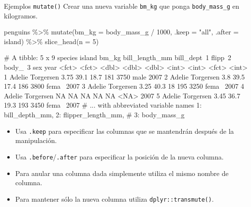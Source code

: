 \documentclass[
  ignorenonframetext,
  aspectratio=169]{beamer}
\newenvironment{Shaded}{\begin{snugshade}}{\end{snugshade}}
\newcommand{\AttributeTok}[1]{\textcolor[rgb]{0.77,0.63,0.00}{#1}}
\newcommand{\DecValTok}[1]{\textcolor[rgb]{0.00,0.00,0.81}{#1}}
\newcommand{\FunctionTok}[1]{\textcolor[rgb]{0.00,0.00,0.00}{#1}}
\newcommand{\NormalTok}[1]{#1}
\newcommand{\SpecialCharTok}[1]{\textcolor[rgb]{0.00,0.00,0.00}{#1}}
\newcommand{\StringTok}[1]{\textcolor[rgb]{0.31,0.60,0.02}{#1}}
\providecommand{\tightlist}{%
  \setlength{\itemsep}{0pt}\setlength{\parskip}{0pt}}
\let\oldverbatim\verbatim
\let\endoldverbatim\endverbatim
\renewenvironment{verbatim}{\tiny\oldverbatim}{\endoldverbatim}
\begin{document}
\begin{frame}[fragile]{Ejemplos \texttt{mutate()}}
\protect\hypertarget{ejemplos-mutate}{}
Crear una nueva variable \texttt{bm\_kg} que ponga
\texttt{body\_mass\_g} en kilogramos.

\begin{Shaded}
\begin{Highlighting}[]
\NormalTok{penguins }\SpecialCharTok{\%\textgreater{}\%} 
  \FunctionTok{mutate}\NormalTok{(}\AttributeTok{bm\_kg =}\NormalTok{ body\_mass\_g }\SpecialCharTok{/} \DecValTok{1000}\NormalTok{, }\AttributeTok{.keep =} \StringTok{"all"}\NormalTok{, }\AttributeTok{.after =}\NormalTok{ island) }\SpecialCharTok{\%\textgreater{}\%} 
  \FunctionTok{slice\_head}\NormalTok{(}\AttributeTok{n =} \DecValTok{5}\NormalTok{)}
\end{Highlighting}
\end{Shaded}

\begin{verbatim}
# A tibble: 5 x 9
  species island    bm_kg bill_length_mm bill_dept~1 flipp~2 body_~3 sex    year
  <fct>   <fct>     <dbl>          <dbl>       <dbl>   <int>   <int> <fct> <int>
1 Adelie  Torgersen  3.75           39.1        18.7     181    3750 male   2007
2 Adelie  Torgersen  3.8            39.5        17.4     186    3800 fema~  2007
3 Adelie  Torgersen  3.25           40.3        18       195    3250 fema~  2007
4 Adelie  Torgersen NA              NA          NA        NA      NA <NA>   2007
5 Adelie  Torgersen  3.45           36.7        19.3     193    3450 fema~  2007
# ... with abbreviated variable names 1: bill_depth_mm, 2: flipper_length_mm,
#   3: body_mass_g
\end{verbatim}

\begin{itemize}
\tightlist
\item
  Usa \texttt{.keep} para especificar las columnas que se mantendrán
  después de la manipulación.
\item
  Usa \texttt{.before}/\texttt{.after} para especificar la posición de
  la nueva columna.
\item
  Para anular una columna dada simplemente utiliza el mismo nombre de
  columna.
\item
  Para mantener sólo la nueva columna utiliza
  \texttt{dplyr::transmute()}.
\end{itemize}
\end{frame}
\end{document}

